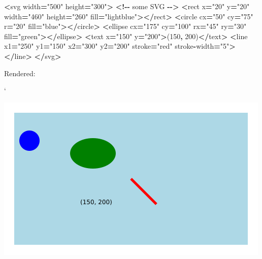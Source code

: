 \documentclass[
  openany]{book}
\newenvironment{Shaded}{\begin{snugshade}}{\end{snugshade}}
\newcommand{\DecValTok}[1]{\textcolor[rgb]{0.00,0.00,0.81}{#1}}
\newcommand{\NormalTok}[1]{#1}
\newcommand{\OperatorTok}[1]{\textcolor[rgb]{0.81,0.36,0.00}{\textbf{#1}}}
\newcommand{\StringTok}[1]{\textcolor[rgb]{0.31,0.60,0.02}{#1}}
\begin{document}
\begin{Shaded}
\begin{Highlighting}[]
\OperatorTok{\textless{}}\NormalTok{svg width}\OperatorTok{=}\StringTok{"500"}\NormalTok{ height}\OperatorTok{=}\StringTok{"300"}\OperatorTok{\textgreater{}}  \OperatorTok{\textless{}!{-}{-}}\NormalTok{ some SVG }\OperatorTok{{-}{-}\textgreater{}}
    \OperatorTok{\textless{}}\NormalTok{rect x}\OperatorTok{=}\StringTok{"20"}\NormalTok{ y}\OperatorTok{=}\StringTok{"20"}\NormalTok{ width}\OperatorTok{=}\StringTok{"460"}\NormalTok{ height}\OperatorTok{=}\StringTok{"260"}\NormalTok{ fill}\OperatorTok{=}\StringTok{"lightblue"}\OperatorTok{\textgreater{}\textless{}/}\NormalTok{rect}\OperatorTok{\textgreater{}}
    \OperatorTok{\textless{}}\NormalTok{circle cx}\OperatorTok{=}\StringTok{"50"}\NormalTok{ cy}\OperatorTok{=}\StringTok{"75"}\NormalTok{ r}\OperatorTok{=}\StringTok{"20"}\NormalTok{ fill}\OperatorTok{=}\StringTok{"blue"}\OperatorTok{\textgreater{}\textless{}/}\NormalTok{circle}\OperatorTok{\textgreater{}}
    \OperatorTok{\textless{}}\NormalTok{ellipse cx}\OperatorTok{=}\StringTok{"175"}\NormalTok{ cy}\OperatorTok{=}\StringTok{"100"}\NormalTok{ rx}\OperatorTok{=}\StringTok{"45"}\NormalTok{ ry}\OperatorTok{=}\StringTok{"30"}\NormalTok{ fill}\OperatorTok{=}\StringTok{"green"}\OperatorTok{\textgreater{}\textless{}/}\NormalTok{ellipse}\OperatorTok{\textgreater{}}
    \OperatorTok{\textless{}}\NormalTok{text x}\OperatorTok{=}\StringTok{"150"}\NormalTok{ y}\OperatorTok{=}\StringTok{"200"}\OperatorTok{\textgreater{}}\NormalTok{(}\DecValTok{150}\OperatorTok{,} \DecValTok{200}\NormalTok{)}\OperatorTok{\textless{}/}\NormalTok{text}\OperatorTok{\textgreater{}}
    \OperatorTok{\textless{}}\NormalTok{line x1}\OperatorTok{=}\StringTok{"250"}\NormalTok{ y1}\OperatorTok{=}\StringTok{"150"}\NormalTok{ x2}\OperatorTok{=}\StringTok{"300"}\NormalTok{ y2}\OperatorTok{=}\StringTok{"200"}\NormalTok{ stroke}\OperatorTok{=}\StringTok{"red"}\NormalTok{ stroke}\OperatorTok{{-}}\NormalTok{width}\OperatorTok{=}\StringTok{"5"}\OperatorTok{\textgreater{}\textless{}/}\NormalTok{line}\OperatorTok{\textgreater{}}
\OperatorTok{\textless{}/}\NormalTok{svg}\OperatorTok{\textgreater{}}
\end{Highlighting}
\end{Shaded}

Rendered:

`

\includegraphics[width=0.5\linewidth]{images/shapessvg}
\end{document}
